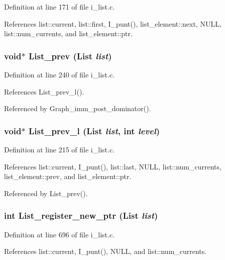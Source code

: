 Definition at line 171 of file i\_\-list.c.

References list::current, list::first, I\_\-punt(), list\_\-element::next, NULL, list::num\_\-currents, and list\_\-element::ptr.
\subsubsection{\setlength{\rightskip}{0pt plus 5cm}void$\ast$ List\_\-prev (\bf{List} {\em list})}\label{i__list_8h_f25e6bb2ba95de48946907f9f21c985b}




Definition at line 240 of file i\_\-list.c.

References List\_\-prev\_\-l().

Referenced by Graph\_\-imm\_\-post\_\-dominator().
\subsubsection{\setlength{\rightskip}{0pt plus 5cm}void$\ast$ List\_\-prev\_\-l (\bf{List} {\em list}, int {\em level})}\label{i__list_8h_547743b6d36084919515cc74574d6bc4}




Definition at line 215 of file i\_\-list.c.

References list::current, I\_\-punt(), list::last, NULL, list::num\_\-currents, list\_\-element::prev, and list\_\-element::ptr.

Referenced by List\_\-prev().
\subsubsection{\setlength{\rightskip}{0pt plus 5cm}int List\_\-register\_\-new\_\-ptr (\bf{List} {\em list})}\label{i__list_8h_556c032cdac7ab24bf31cef6364310ba}




Definition at line 696 of file i\_\-list.c.

References list::current, I\_\-punt(), NULL, and list::num\_\-currents.

